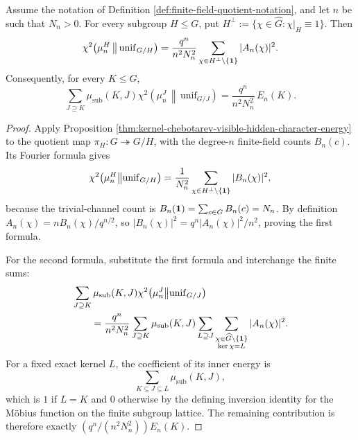 \begin{lemma}\label{lem:finite-field-exact-quotient-normalization}
Assume the notation of Definition \ref{def:finite-field-quotient-notation}, and let \(n\) be such that \(N_n>0\). For every subgroup \(H\le G\), put \(H^\perp:=\{\chi\in\widehat G:\chi|_H\equiv1\}\). Then
\[
\chi^2\!\left(\mu_n^H\,\middle\|\,\mathrm{unif}_{G/H}\right)
=
\frac{q^n}{n^2N_n^2}
\sum_{\chi\in H^\perp\setminus\{\mathbf{1}\}}|A_n(\chi)|^2.
\]
Consequently, for every \(K\le G\),
\[
\sum_{J\supseteq K}\mu_{\mathrm{sub}}(K,J)
\chi^2\!\left(\mu_n^J\,\middle\|\,\mathrm{unif}_{G/J}\right)
=
\frac{q^n}{n^2N_n^2}\,E_n(K).
\]
\end{lemma}

\begin{proof}
Apply Proposition \ref{thm:kernel-chebotarev-visible-hidden-character-energy} to the quotient map \(\pi_H:G\twoheadrightarrow G/H\), with the degree-\(n\) finite-field counts \(B_n(c)\). Its Fourier formula gives
\[
\chi^2\!\left(\mu_n^H\middle\|\mathrm{unif}_{G/H}\right)
=
\frac{1}{N_n^2}
\sum_{\chi\in H^\perp\setminus\{\mathbf{1}\}}|B_n(\chi)|^2,
\]
because the trivial-channel count is \(B_n(\mathbf{1})=\sum_{c\in G}B_n(c)=N_n\). By definition \(A_n(\chi)=nB_n(\chi)/q^{n/2}\), so \(|B_n(\chi)|^2=q^n|A_n(\chi)|^2/n^2\), proving the first formula.

For the second formula, substitute the first formula and interchange the finite sums:
\[
\begin{aligned}
&\sum_{J\supseteq K}\mu_{\mathrm{sub}}(K,J)
\chi^2\!\left(\mu_n^J\middle\|\mathrm{unif}_{G/J}\right)\\
&\qquad=
\frac{q^n}{n^2N_n^2}
\sum_{J\supseteq K}\mu_{\mathrm{sub}}(K,J)
\sum_{\substack{L\supseteq J}}
\sum_{\substack{\chi\in\widehat G\setminus\{\mathbf{1}\}\\ \ker\chi=L}}
|A_n(\chi)|^2.
\end{aligned}
\]
For a fixed exact kernel \(L\), the coefficient of its inner energy is
\[
\sum_{K\subseteq J\subseteq L}\mu_{\mathrm{sub}}(K,J),
\]
which is \(1\) if \(L=K\) and \(0\) otherwise by the defining inversion identity for the M\"obius function on the finite subgroup lattice. The remaining contribution is therefore exactly \((q^n/(n^2N_n^2))E_n(K)\).
\end{proof}

